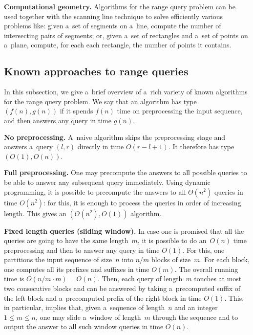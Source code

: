 \documentclass{toc}
\begin{document}
\textbf{Computational geometry.} Algorithms for the range %
query  %
problem
can be used together with the scanning line technique to solve efficiently various problems like: given a~set of segments on a~line, compute the number of intersecting pairs of segments; or, given a~set of rectangles and a~set of points on a~plane, compute, for each each rectangle, the number of points it contains.

\subsection{Known approaches to range queries}\label{subsec:approaches}

In this subsection, we give a~brief overview of a~rich variety of known
algorithms for the
range query
problem. We say that an algorithm has type
$(f(n), g(n))$ if it spends $f(n)$ time on preprocessing the input sequence,
and then answers any query in time $g(n)$.

\textbf{No preprocessing.} A~naive algorithm skips the preprocessing stage and
answers a~query $(l,r)$ directly in time $O(r-l+1)$. It therefore has type
$(O(1), O(n))$.

\textbf{Full preprocessing.} One may precompute the answers to all possible
queries to be able to answer any subsequent query immediately. Using dynamic
programming, it is possible to precompute the answers to all $\Theta(n^2)$
queries in time $O(n^2)$: for this, it is enough to process the queries in
order of increasing length. This gives an $(O(n^2), O(1))$ algorithm.

\textbf{Fixed length queries (sliding window).} In case one is promised that all
the queries are going to have the same length~$m$, it is possible to do
an~$O(n)$ time preprocessing and then to answer any query in time $O(1)$. For
this, one partitions the input sequence of size~$n$ into $n/m$ blocks of
size~$m$. For each block, one computes all its prefixes and suffixes in time
$O(m)$. The overall running time is $O(n/m \cdot m)=O(n)$. Then, each query
of length~$m$ touches at most two consecutive blocks and can be answered by
taking a~precomputed suffix of the left block and a~precomputed prefix of the
right block in time $O(1)$. This, in particular, implies that, given a~sequence
of length~$n$ and an integer $1 \le m \le n$, one may slide a~window of
length~$m$ through the sequence and to output the answer to all such window
queries in time $O(n)$.
\end{document}
